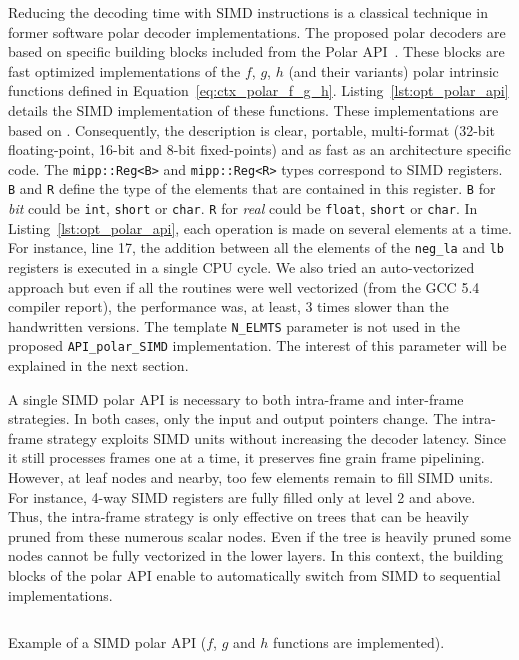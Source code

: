 Reducing the decoding time with SIMD instructions is a classical technique in
former software polar decoder implementations. The proposed polar decoders are
based on specific building blocks included from the Polar
API~\cite{Cassagne2015c,Cassagne2016b}. These blocks are fast optimized
implementations of the $f$, $g$, $h$ (and their variants) polar intrinsic
functions defined in Equation~\ref{eq:ctx_polar_f_g_h}.
Listing~\ref{lst:opt_polar_api} details the SIMD implementation of these
functions. These implementations are based on \MIPP. Consequently, the
description is clear, portable, multi-format (32-bit floating-point, 16-bit and
8-bit fixed-points) and as fast as an architecture specific code. The
\verb|mipp::Reg<B>| and \verb|mipp::Reg<R>| types correspond to SIMD registers.
\verb|B| and \verb|R| define the type of the elements that are contained in this
register. \verb|B| for \textit{bit} could be \verb|int|, \verb|short| or
\verb|char|. \verb|R| for \textit{real} could be \verb|float|, \verb|short| or
\verb|char|. In Listing~\ref{lst:opt_polar_api}, each operation is made on
several elements at a time. For instance, line 17, the addition between all the
elements of the \verb|neg_la| and \verb|lb| registers is executed in a single
CPU cycle. We also tried an auto-vectorized approach but even if all the
routines were well vectorized (from the GCC 5.4 compiler report), the
performance was, at least, 3 times slower than the \MIPP handwritten versions.
The template \verb|N_ELMTS| parameter is not used in the proposed
\verb|API_polar_SIMD| implementation. The interest of this parameter will be
explained in the next section.

A single SIMD polar API is necessary to both intra-frame and inter-frame
strategies. In both cases, only the input and output pointers change. The
intra-frame strategy exploits SIMD units without increasing the decoder latency.
Since it still processes frames one at a time, it preserves fine grain
frame pipelining. However, at leaf nodes and nearby, too few elements remain to
fill SIMD units. For instance, 4-way SIMD registers are fully filled only at
level 2 and above. Thus, the intra-frame strategy is only effective on trees
that can be heavily pruned from these numerous scalar nodes. Even if the tree is
heavily pruned some nodes cannot be fully vectorized in the lower layers. In
this context, the building blocks of the polar API enable to automatically
switch from SIMD to sequential implementations.

\begin{listing}
  \inputminted[frame=lines,linenos]{C++}{\curChapter/src/polar/f_g_h_simd.cpp}
  \caption{Example of a \Cxx SIMD polar API ($f$, $g$ and $h$ functions are
    implemented).}
  \label{lst:opt_polar_api}
\end{listing}

